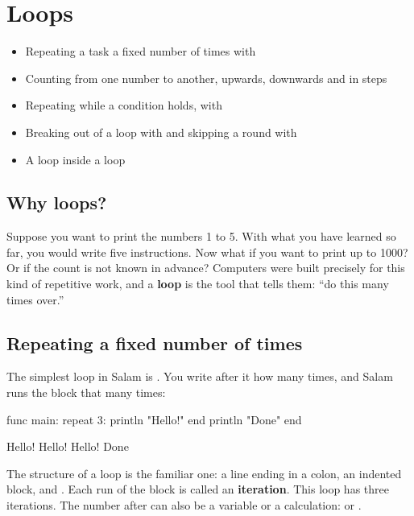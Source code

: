 \chapter{Loops}\label{ch:loops}

\begin{goals}
\begin{itemize}
  \item Repeating a task a fixed number of times with 
  \item Counting from one number to another, upwards, downwards and in steps
  \item Repeating while a condition holds, with 
  \item Breaking out of a loop with  and skipping a round with 
  \item A loop inside a loop
\end{itemize}
\end{goals}

\section{Why loops?}

Suppose you want to print the numbers 1 to 5. With what you have learned so
far, you would write five  instructions. Now what if you want
to print up to 1000? Or if the count is not known in advance? Computers were
built precisely for this kind of repetitive work, and a \textbf{loop} is the
tool that tells them: ``do this many times over.''

\section{Repeating a fixed number of times}

The simplest loop in Salam is . You write after it how many
times, and Salam runs the block that many times:

\begin{salamcode}
func main:
    repeat 3:
        println "Hello!"
    end
    println "Done"
end
\end{salamcode}

\begin{salamout}
Hello!
Hello!
Hello!
Done
\end{salamout}

The structure of a loop is the familiar one: a line ending in a colon, an
indented block, and . Each run of the block is called an
\textbf{iteration}. This loop has three iterations. The number after
 can also be a variable or a calculation:
 or .


